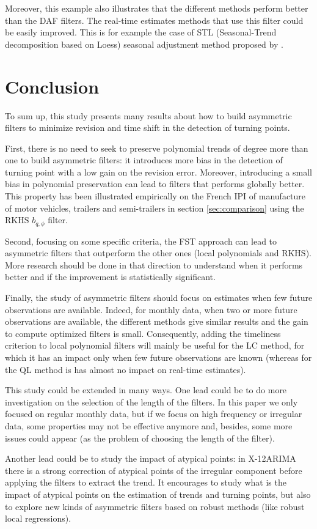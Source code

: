 \documentclass[
  12pt,
  ,
  a4paper]{article}
\newcommand\1{\mathds{1}}
\begin{document}
Moreover, this example also illustrates that the different methods perform better than the DAF filters.
The real-time estimates methods that use this filter could be easily improved.
This is for example the case of STL (Seasonal-Trend decomposition based on Loess) seasonal adjustment method proposed by \textcite{cleveland90}.

\newpage

\hypertarget{conclusion}{%
\section*{Conclusion}\label{conclusion}}

To sum up, this study presents many results about how to build asymmetric filters to minimize revision and time shift in the detection of turning points.

First, there is no need to seek to preserve polynomial trends of degree more than one to build asymmetric filters: it introduces more bias in the detection of turning point with a low gain on the revision error. Moreover, introducing a small bias in polynomial preservation can lead to filters that performs globally better.
This property has been illustrated empirically on the French IPI of manufacture of motor vehicles, trailers and semi-trailers in section \ref{sec:comparison} using the RKHS \(b_{q,\phi}\) filter.

Second, focusing on some specific criteria, the FST approach can lead to asymmetric filters that outperform the other ones (local polynomials and RKHS).
More research should be done in that direction to understand when it performs better and if the improvement is statistically significant.

Finally, the study of asymmetric filters should focus on estimates when few future observations are available.
Indeed, for monthly data, when two or more future observations are available, the different methods give similar results and the gain to compute optimized filters is small.
Consequently, adding the timeliness criterion to local polynomial filters will mainly be useful for the LC method, for which it has an impact only when few future observations are known (whereas for the QL method is has almost no impact on real-time estimates).

This study could be extended in many ways.
One lead could be to do more investigation on the selection of the length of the filters.
In this paper we only focused on regular monthly data, but if we focus on high frequency or irregular data, some properties may not be effective anymore and, besides, some more issues could appear (as the problem of choosing the length of the filter).

Another lead could be to study the impact of atypical points: in X-12ARIMA there is a strong correction of atypical points of the irregular component before applying the filters to extract the trend.
It encourages to study what is the impact of atypical points on the estimation of trends and turning points, but also to explore new kinds of asymmetric filters based on robust methods (like robust local regressions).

\newpage

\printbibliography[title=References]
\end{document}
